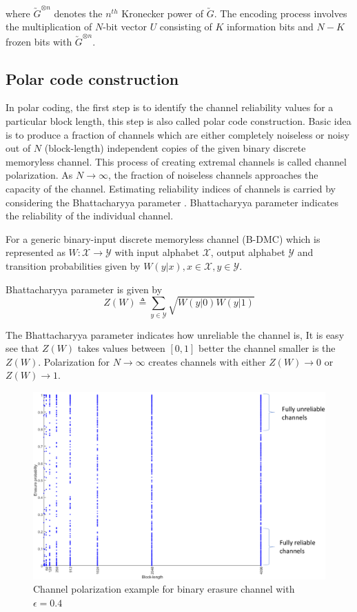where $\utilde{G}^{\otimes n}$ denotes the $n^{th}$ Kronecker power of $\utilde{G}$. The encoding process involves the multiplication of $N$-bit vector $U$ consisting of $K$ information bits and $N-K$ frozen bits with $\utilde{G}^{\otimes n}$.

\subsection{Polar code construction} \label{CodeConstruction}
In polar coding, the first step is to identify the channel reliability values for a particular block length, this step is also called polar code construction. Basic idea is to produce a fraction of channels which are either completely noiseless or noisy out of $N$ (block-length) independent copies of the given binary discrete memoryless channel. This process of creating extremal channels is called channel polarization. As $N\to\infty$, the fraction of noiseless channels approaches the capacity of the channel. Estimating reliability indices of channels is carried by considering the Bhattacharyya parameter \cite{Arikan}. Bhattacharyya parameter indicates the reliability of the individual channel.

For a generic binary-input discrete memoryless channel (B-DMC) which is represented as $W \colon \mathcal{X} \to \mathcal{Y}$ with input alphabet $\mathcal{X}$, output alphabet $\mathcal{Y}$ and transition probabilities given by $W(y|x),x \in \mathcal{X}, y \in \mathcal{Y}$.

Bhattacharyya parameter is given by 
\begin{equation}
	Z(W) \triangleq \sum_{y \in \mathcal{Y}} \sqrt{W(y|0)W(y|1)}
\end{equation}

The Bhattacharyya parameter indicates how unreliable the channel is, It is easy see that $Z(W)$ takes values between $[0,1]$ better the channel smaller is the $Z(W)$. Polarization for $N \to \infty$ creates channels with either $Z(W) \to 0$ or $Z(W) \to 1$.

\begin{figure}[h]
	\centering
	\includegraphics[width=1\textwidth]{./figures/channelPolarization1.pdf}
	\caption{Channel polarization example for binary erasure channel with $\epsilon = 0.4$}
	\label{fig:channelPolarizationPlot}
\end{figure}

